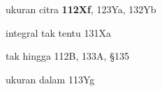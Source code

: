 ukuran citra {\bf 112Xf}, 123Ya, 132Yb































integral tak tentu 131Xa





























































tak hingga 112B, 133A, \S135
















ukuran dalam 113Yg

